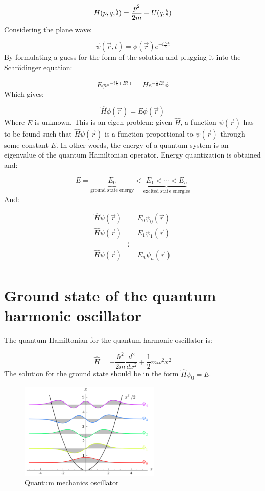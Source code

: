 $$H(p,q, \bcancel{t}) = \frac{p^2}{2m}+U(q,\bcancel{t})$$
\noindent
Considering the plane wave:

$$\psi(\vec{r}, t) = \phi(\vec{r}) e^{-i \frac{E}{\hbar}t}$$
\noindent
By formulating a guess for the form of the solution and plugging it into the Schr\"odinger equation:

$$E\phi e^{-i \frac{i}{\hbar}(Et)} = He^{-\frac{i}{\hbar}Et}\phi$$
\noindent
Which gives:

$$\hat{H}\phi(\vec{r}) = E\phi(\vec{r})$$
\noindent
Where $E$ is unknown.
This is an eigen problem: given $\hat{H}$, a function $\psi(\vec{r})$ has to be found such that $\hat{H}\psi(\vec{r})$ is a function proportional to $\psi(\vec{r})$ through some constant $E$.
In other words, the energy of a quantum system is an eigenvalue of the quantum Hamiltonian operator.
Energy quantization is obtained and:

$$E = \underbrace{E_0}_{\text{ground state energy}} < \underbrace{E_1 < \cdots < E_n}_{\text{excited state energies}}$$
\noindent
And:

\begin{align*}
  \hat{H}\psi(\vec{r}) &= E_0\psi_0(\vec{r})\\
  \hat{H}\psi(\vec{r}) &= E_1\psi_1(\vec{r})\\
                       &\vdots\\
  \hat{H}\psi(\vec{r}) &= E_n\psi_n(\vec{r})\\
\end{align*}

\section{Ground state of the quantum harmonic oscillator}
The quantum Hamiltonian for the quantum harmonic oscillator is:

$$\hat{H} = - \frac{\hbar^2}{2m}\frac{d{^2}}{d{x^2}} +\frac{1}{2}m\omega^2 x^2$$
\noindent
The solution for the ground state should be in the form $\hat{H}\psi_0 = E$.
\begin{figure}[h!]
    \centering
    \includegraphics[clip, width=0.6\textwidth]{qm_oscillator.png}
    \caption{\label{fig:qm_oscillator} Quantum mechanics oscillator }
\end{figure}
